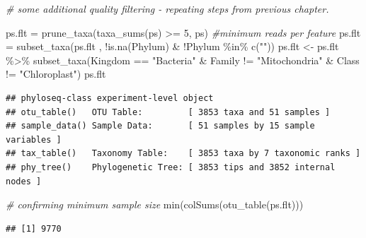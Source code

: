 \documentclass[
]{book}
\newenvironment{Shaded}{\begin{snugshade}}{\end{snugshade}}
\newcommand{\CommentTok}[1]{\textcolor[rgb]{0.56,0.35,0.01}{\textit{#1}}}
\newcommand{\DecValTok}[1]{\textcolor[rgb]{0.00,0.00,0.81}{#1}}
\newcommand{\FunctionTok}[1]{\textcolor[rgb]{0.00,0.00,0.00}{#1}}
\newcommand{\NormalTok}[1]{#1}
\newcommand{\OtherTok}[1]{\textcolor[rgb]{0.56,0.35,0.01}{#1}}
\newcommand{\SpecialCharTok}[1]{\textcolor[rgb]{0.00,0.00,0.00}{#1}}
\newcommand{\StringTok}[1]{\textcolor[rgb]{0.31,0.60,0.02}{#1}}
\begin{document}
\begin{Shaded}
\begin{Highlighting}[]
\CommentTok{\# some additional quality filtering {-} repeating steps from previous chapter. }
  
\NormalTok{ps.flt }\OtherTok{=} \FunctionTok{prune\_taxa}\NormalTok{(}\FunctionTok{taxa\_sums}\NormalTok{(ps) }\SpecialCharTok{\textgreater{}=} \DecValTok{5}\NormalTok{, ps) }\CommentTok{\#minimum reads per feature }
\NormalTok{ps.flt  }\OtherTok{=} \FunctionTok{subset\_taxa}\NormalTok{(ps.flt , }\SpecialCharTok{!}\FunctionTok{is.na}\NormalTok{(Phylum) }\SpecialCharTok{\&} \SpecialCharTok{!}\NormalTok{Phylum }\SpecialCharTok{\%in\%} \FunctionTok{c}\NormalTok{(}\StringTok{""}\NormalTok{))}
\NormalTok{ps.flt }\OtherTok{\textless{}{-}}\NormalTok{ ps.flt }\SpecialCharTok{\%\textgreater{}\%}
  \FunctionTok{subset\_taxa}\NormalTok{(Kingdom }\SpecialCharTok{==} \StringTok{"Bacteria"} \SpecialCharTok{\&}\NormalTok{ Family  }\SpecialCharTok{!=} \StringTok{"Mitochondria"} \SpecialCharTok{\&}\NormalTok{ Class   }\SpecialCharTok{!=} \StringTok{"Chloroplast"}\NormalTok{)}
\NormalTok{ps.flt }
\end{Highlighting}
\end{Shaded}

\begin{verbatim}
## phyloseq-class experiment-level object
## otu_table()   OTU Table:         [ 3853 taxa and 51 samples ]
## sample_data() Sample Data:       [ 51 samples by 15 sample variables ]
## tax_table()   Taxonomy Table:    [ 3853 taxa by 7 taxonomic ranks ]
## phy_tree()    Phylogenetic Tree: [ 3853 tips and 3852 internal nodes ]
\end{verbatim}

\begin{Shaded}
\begin{Highlighting}[]
\CommentTok{\# confirming minimum sample size}
\FunctionTok{min}\NormalTok{(}\FunctionTok{colSums}\NormalTok{(}\FunctionTok{otu\_table}\NormalTok{(ps.flt)))}
\end{Highlighting}
\end{Shaded}

\begin{verbatim}
## [1] 9770
\end{verbatim}
\end{document}
